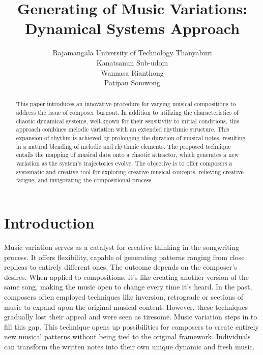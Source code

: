 \documentclass[11pt]{article}
\title{Generating of Music Variations: Dynamical Systems Approach}
\author{Rajamangala University of Technology Thanyaburi\\Kanatsanun Sub-udom\\Wannasa Rianthong\\Patipan Somwong}
\theoremstyle{definition}
\begin{document}
\maketitle
\begin{abstract}
This paper introduces an innovative procedure for varying musical compositions to address the issue of composer burnout. In addition to utilizing the characteristics of chaotic dynamical systems, well-known for their sensitivity to initial conditions, this approach combines melodic variation with an extended rhythmic structure. This expansion of rhythm is achieved by prolonging the duration of musical notes, resulting in a natural blending of melodic and rhythmic elements. The proposed technique entails the mapping of musical data onto a chaotic attractor, which generates a new variation as the system's trajectories evolve.  The objective is to offer composers a systematic and creative tool for exploring creative musical concepts, relieving creative fatigue, and invigorating the compositional process.
\end{abstract}

\section{Introduction}
Music variation serves as a catalyst for creative thinking in the songwriting process. It offers flexibility, capable of generating patterns ranging from close replicas to entirely different ones. The outcome depends on the composer's desires. When applied to compositions, it's like creating another version of the same song, making the music open to change every time it's heard. In the past, composers often employed techniques like inversion, retrograde or sections of music to expand upon the original musical content. However, these techniques gradually lost their appeal and were seen as tiresome. Music variation steps in to fill this gap. This technique opens up possibilities for composers to create entirely new musical patterns without being tied to the original framework. Individuals can transform the written notes into their own unique dynamic and fresh music.
\end{document}
